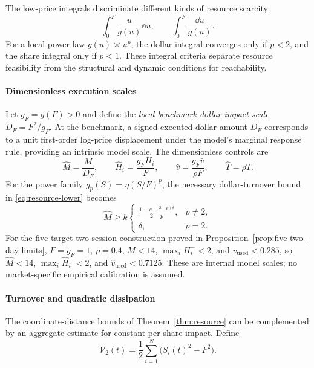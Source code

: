 \documentclass[review,hidelinks,onefignum,onetabnum]{siamonline250211}
\begin{document}
The low-price integrals discriminate different kinds of resource scarcity:
\begin{equation}\label{eq:lowprice}
\int_0^F\frac{u}{g(u)}\dd u,\qquad
\int_0^F\frac{\dd u}{g(u)}.
\end{equation}
For a local power law $g(u)\asymp u^p$, the dollar integral converges only if $p<2$, and the share integral only if $p<1$. These integral criteria separate resource feasibility from the structural and dynamic conditions for reachability.

\paragraph{Dimensionless execution scales}
Let $g_F=g(F)>0$ and define the \emph{local benchmark dollar-impact scale} $D_F=F^2/g_F$. At the benchmark, a signed executed-dollar amount $D_F$ corresponds to a unit first-order log-price displacement under the model's marginal response rule, providing an intrinsic model scale. The dimensionless controls are
\[
\widehat M=\frac{M}{D_F},\qquad
\widehat H_i=\frac{g_F H_i}{F},\qquad
\widehat v=\frac{g_F\bar v}{\rho F},\qquad
\widehat T=\rho T.
\]
For the power family $g_p(S)=\eta(S/F)^p$, the necessary dollar-turnover bound in \eqref{eq:resource-lower} becomes
\[
\widehat M\ge k\begin{cases}
\displaystyle\frac{1-e^{-(2-p)\delta}}{2-p},&p\ne2,\\[4pt]
\delta,&p=2.
\end{cases}
\]
For the five-target two-session construction proved in Proposition~\ref{prop:five-two-day-limits}, $F=g_F=1$, $\rho=0.4$, $M<14$, $\max_iH_i^-<2$, and $\bar v_{\mathrm{used}}<0.285$, so $\widehat M<14$, $\max_i\widehat H_i^-<2$, and $\widehat v_{\mathrm{used}}<0.7125$. These are internal model scales; no market-specific empirical calibration is assumed.



\paragraph{Turnover and quadratic dissipation}
The coordinate-distance bounds of Theorem~\ref{thm:resource} can be complemented
by an aggregate estimate for constant per-share impact. Define
\[
\mathcal V_2(t)=\frac12\sum_{i=1}^N\bigl(S_i(t)^2-F^2\bigr).
\]
\end{document}
